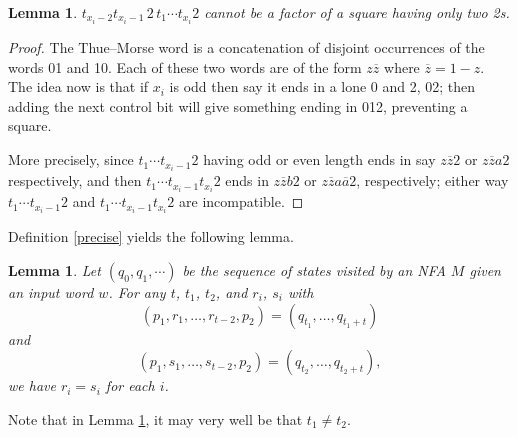 \documentclass[12pt]{article}
\theoremstyle{plain}
\newtheorem{lem}[thm]{Lemma}
\theoremstyle{definition}
\theoremstyle{remark}
\begin{document}
			\begin{lem}\label{thue}
				$t_{x_i-2} t_{x_i-1}\, 2\, t_1 \cdots t_{x_i}2$ cannot be a factor of a square having only two 2s.
			\end{lem}
			\begin{proof}
				The Thue--Morse word is a concatenation of disjoint occurrences of the words 01 and 10.
				Each of these two words are of the form $z\overline z$ where $\overline z=1-z$.
				The idea now is that if $x_i$ is odd then say it ends in a lone 0 and 2, 02;
				then adding the next control bit will give something ending in 012, preventing a square.

				More precisely, since $t_1 \cdots t_{x_i-1}2$ having odd or even length ends in say
				$z\overline z2$ or $z\overline za2$ respectively,
				and then $t_1 \cdots t_{x_i-1}t_{x_i}2$ ends in $z\overline zb2$ or $z\overline z a\overline a2$, respectively;
				either way $t_1 \cdots t_{x_i-1}2$ and $t_1 \cdots t_{x_i-1}t_{x_i}2$ are incompatible.
			\end{proof}

			Definition \ref{precise} yields the following lemma.
			\begin{lem}\label{precisedef}
				Let $(q_0,q_1,\cdots)$ be the sequence of states visited by an NFA $M$ given an input word $w$.
				For any $t$, $t_1$, $t_2$, and $r_i$, $s_i$ with
				\[
					(p_1, r_1, \ldots, r_{t-2}, p_2) = (q_{t_1}, \ldots, q_{t_1+t})
				\]
				and
				\[
					(p_1, s_1, \ldots, s_{t-2}, p_2) = (q_{t_2}, \ldots, q_{t_2+t}),
				\]
				we have $r_i=s_i$ for each $i$.
			\end{lem}
			Note that in Lemma \ref{precisedef}, it may very well be that $t_1\ne t_2$.
\end{document}
